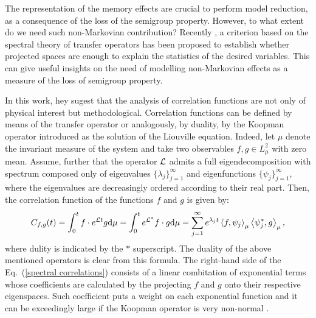 \documentclass[12pt]{article}
\begin{document}
The representation of the memory effects are crucial to perform model reduction, as a consequence of the loss of the semigroup property. However, to what extent do we need such non-Markovian contribution? Recently \cite{chekroun2019c}, a criterion based on the spectral theory of transfer operators has been proposed to establish whether projected spaces are enough to explain the statistics of the desired variables. This can give useful insights on the need of modelling non-Markovian effects as a measure of the loss of semigroup property. 

In this work, hey sugest that the analysis of correlation functions are not only of physical interest but methodological. Correlation functions can be defined by means of the transfer operator or analogously, by duality, by the Koopman operator introduced as the solution of the Liouville equation. Indeed, let $\mu$ denote the invariant measure of the system and take two observables $f,g\in L^2_{\mu}$ with zero mean. Assume, further that the operator $\mathcal{L}$ admits a full eigendecomposition with spectrum composed only of eigenvalues $\{\lambda _j\}_{j=1}^{\infty}$ and eigenfunctions $\{\psi_j\}_{j=1}^{\infty}$, where the eigenvalues are decreasingly ordered according to their real part. Then, the correlation function of the functions $f$ and $g$ is given by:
\begin{equation}\label{spectral correlations}
C_{f,g}(t) = \int _{0}^tf\cdot e^{\mathcal{L} t}g\mathrm{d} \mu = \int _{0}^te^{\mathcal{L}^{\ast}}f\cdot g \mathrm{d} \mu= \sum_{j=1}^{\infty}e^{\lambda _jt}\left \langle f,\psi_j \right \rangle _{\mu}\left \langle \psi_j^{\ast},g \right \rangle _{\mu},
\end{equation}
where dulity is indicated by the $\ast$ superscript. The duality of the above mentioned operators is clear from this formula. The right-hand side of the Eq.~(\ref{spectral correlations}) consists of a linear combitation of exponential terms whose coefficients are calculated by the projecting $f$ and $g$ onto their respective eigenspaces. Such coefficient puts a weight on each exponential function and it can be exceedingly large if the Koopman operator is very non-normal \cite{trefethen2005}. 
\end{document}
